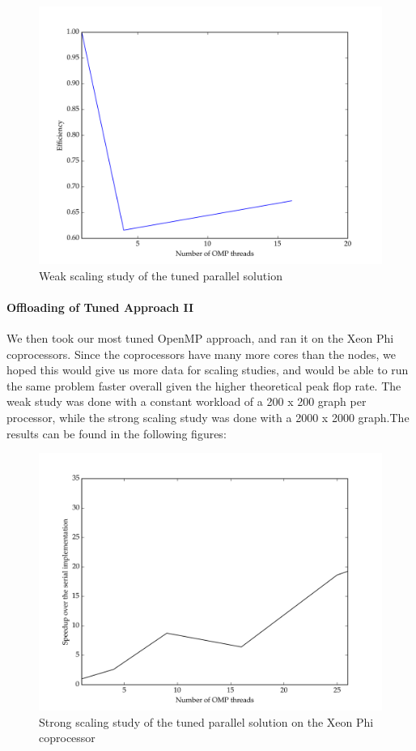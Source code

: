 \documentclass[11pt]{article}
\begin{document}
\begin{figure}[H]
\centering
\includegraphics[scale=0.5]{./scaling_studies/weak_scaling_eric.png}
\caption{Weak scaling study of the tuned parallel solution}
\label{fig:ws_eric}
\end{figure}

\paragraph{Offloading of Tuned Approach II}
We then took our most tuned OpenMP approach, and ran it on the Xeon Phi coprocessors. Since the coprocessors have many more cores than the nodes, we hoped this would give us more data for scaling studies, and would be able to run the same problem faster overall given the higher theoretical peak flop rate. The weak study was done with a constant workload of a 200 x 200 graph per processor, while the strong scaling study was done with a 2000 x 2000 graph.The results can be found in the following figures:

\begin{figure}[H]
\centering
\includegraphics[scale=0.5]{./scaling_studies/strong_scaling_offload.png}
\caption{Strong scaling study of the tuned parallel solution on the Xeon Phi coprocessor}
\label{fig:ss_offload}
\end{figure}
\end{document}
